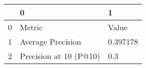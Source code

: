 \begin{tabular}{lll}
\toprule
{} &                       0 &         1 \\
\midrule
0 &                  Metric &     Value \\
1 &       Average Precision &  0.397178 \\
2 &  Precision at 10 (P@10) &       0.3 \\
\bottomrule
\end{tabular}
